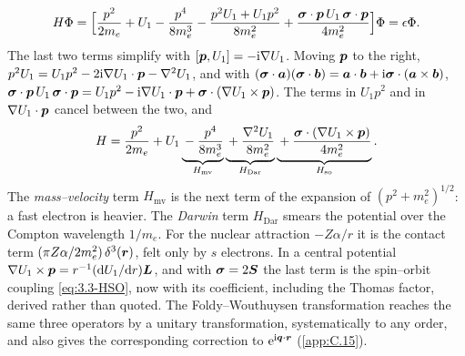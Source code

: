 \begin{equation*}
  H\Phi = \Bigl[\frac{p^2}{2m_e} + U_1 - \frac{p^4}{8m_e^3} - \frac{p^2U_1 + U_1p^2}{8m_e^2} + \frac{\boldsymbol{\sigma}\cdot\bm{p}\,U_1\,\boldsymbol{\sigma}\cdot\bm{p}}{4m_e^2}\Bigr]\Phi = \epsilon\Phi .
\end{equation*}
The last two terms simplify with $[\bm{p}, U_1] = -\mathrm{i}\nabla U_1$. Moving $\bm{p}$ to the right, $p^2U_1 = U_1p^2 - 2\mathrm{i}\nabla U_1\cdot\bm{p} - \nabla^2U_1$, and with $(\boldsymbol{\sigma}\cdot\bm{a})(\boldsymbol{\sigma}\cdot\bm{b}) = \bm{a}\cdot\bm{b} + \mathrm{i}\boldsymbol{\sigma}\cdot(\bm{a}\times\bm{b})$, $\boldsymbol{\sigma}\cdot\bm{p}\,U_1\,\boldsymbol{\sigma}\cdot\bm{p} = U_1p^2 - \mathrm{i}\nabla U_1\cdot\bm{p} + \boldsymbol{\sigma}\cdot(\nabla U_1\times\bm{p})$. The terms in $U_1p^2$ and in $\nabla U_1\cdot\bm{p}$ cancel between the two, and
\begin{equation}
  H = \frac{p^2}{2m_e} + U_1 \underbrace{{}- \frac{p^4}{8m_e^3}}_{H_{\mathrm{mv}}} \underbrace{{}+ \frac{\nabla^2U_1}{8m_e^2}}_{H_{\mathrm{Dar}}} \underbrace{{}+ \frac{\boldsymbol{\sigma}\cdot(\nabla U_1\times\bm{p})}{4m_e^2}}_{H_{\mathrm{so}}} .
  \label{eq:3.5-HBP}
\end{equation}
The \emph{mass--velocity} term $H_{\mathrm{mv}}$ is the next term of the expansion of $(p^2 + m_e^2)^{1/2}$: a fast electron is heavier. The \emph{Darwin} term $H_{\mathrm{Dar}}$ smears the potential over the Compton wavelength $1/m_e$. For the nuclear attraction $-Z\alpha/r$ it is the contact term $(\pi Z\alpha/2m_e^2)\,\delta^3(\bm{r})$, felt only by $s$ electrons. In a central potential $\nabla U_1\times\bm{p} = r^{-1}(\mathrm{d} U_1/\mathrm{d} r)\bm{L}$, and with $\boldsymbol{\sigma} = 2\bm{S}$ the last term is the spin--orbit coupling \cref{eq:3.3-HSO}, now with its coefficient, including the Thomas factor, derived rather than quoted. The Foldy--Wouthuysen transformation reaches the same three operators by a unitary transformation, systematically to any order, and also gives the corresponding correction to $\mathrm{e}^{\mathrm{i}\bm{q}\cdot\bm{r}}$ (\cref{app:C.15}).

